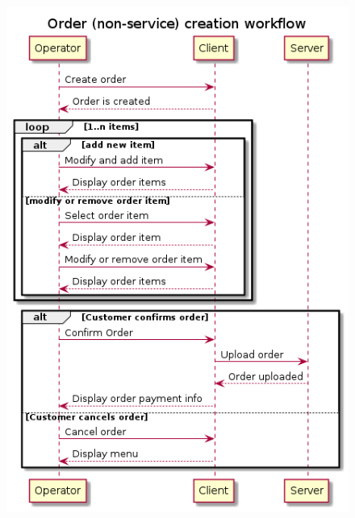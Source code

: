 \documentclass{article}
\begin{document}
    \begin{figure}[H]
        \centering
        \includegraphics[width=0.9\linewidth]{PSP/lab-1/diagrams/sequence/order.png}
        \caption{}
        \label{}
    \end{figure}
\end{document}
